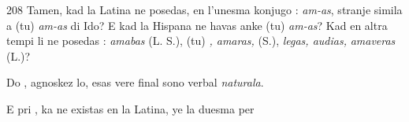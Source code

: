 \begin{VUpage}[212]{208}
Tamen, kad la Latina ne posedas, en l'unesma konjugo :\nl
\textit{am-as}, stranje simila a (tu) \textit{am-as} di Ido? E kad la Hispana\nl
ne havas anke (tu) \textit{am-as}? Kad en altra tempi li ne posedas :\nl
\textit{amabas} (L. S.), (tu) \textit{, amaras, } (S.), \textit{legas, audias,}\nl
\textit{amaveras} (L.)?

Do , agnoskez lo, esas vere final sono verbal \textit{naturala}.\parplein

E pri , ka ne existas en la Latina, ye la duesma per\cc
\end{VUpage}

